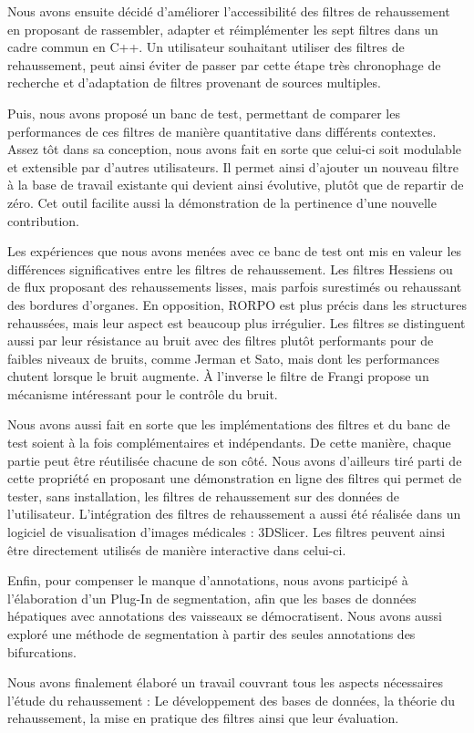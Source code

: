 Nous avons ensuite décidé d'améliorer l'accessibilité des filtres de rehaussement en proposant de rassembler, adapter et réimplémenter les sept filtres dans un cadre commun en C++. Un utilisateur souhaitant utiliser des filtres de rehaussement, peut ainsi éviter de passer par cette étape très chronophage de recherche et d'adaptation de filtres provenant de sources multiples. 

Puis, nous avons proposé un banc de test, permettant de comparer les performances de ces filtres de manière quantitative dans différents contextes. Assez tôt dans sa conception, nous avons fait en sorte que celui-ci soit modulable et extensible par d'autres utilisateurs. Il permet ainsi d'ajouter un nouveau filtre à la base de travail existante qui devient ainsi évolutive, plutôt que de repartir de zéro. Cet outil facilite aussi la démonstration de la pertinence d'une nouvelle contribution.

Les expériences que nous avons menées avec ce banc de test ont mis en valeur les différences significatives entre les filtres de rehaussement. Les filtres Hessiens ou de flux proposant des rehaussements lisses, mais parfois surestimés ou rehaussant des bordures d'organes. En opposition, RORPO est plus précis dans les structures rehaussées, mais leur aspect est beaucoup plus irrégulier. Les filtres se distinguent aussi par leur résistance au bruit avec des filtres plutôt performants pour de faibles niveaux de bruits, comme Jerman et Sato, mais dont les performances chutent lorsque le bruit augmente. À l'inverse le filtre de Frangi propose un mécanisme intéressant pour le contrôle du bruit.

Nous avons aussi fait en sorte que les implémentations des filtres et du banc de test soient à la fois complémentaires et indépendants. De cette manière, chaque partie peut être réutilisée chacune de son côté. Nous avons d'ailleurs tiré parti de cette propriété en proposant une démonstration en ligne des filtres qui permet de tester, sans installation, les filtres de rehaussement sur des données de l'utilisateur. L'intégration des filtres de rehaussement a aussi été réalisée dans un logiciel de visualisation d'images médicales : 3DSlicer. Les filtres peuvent ainsi être directement utilisés de manière interactive dans celui-ci.

Enfin, pour compenser le manque d'annotations, nous avons participé à l'élaboration d'un Plug-In de segmentation, afin que les bases de données hépatiques avec annotations des vaisseaux se démocratisent. Nous avons aussi exploré une méthode de segmentation à partir des seules annotations des bifurcations.

Nous avons finalement élaboré un travail couvrant tous les aspects nécessaires l'étude du rehaussement : Le développement des bases de données, la théorie du rehaussement, la mise en pratique des filtres ainsi que leur évaluation.